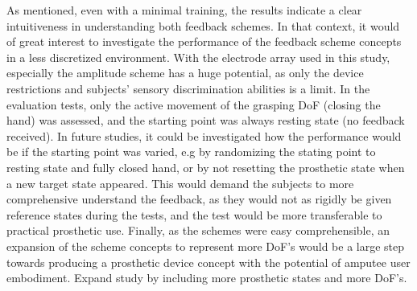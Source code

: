 As mentioned, even with a minimal training, the results indicate a clear intuitiveness in understanding both feedback schemes. In that context, it would of great interest to investigate the performance of the feedback scheme concepts in a less discretized environment. With the electrode array used in this study, especially the amplitude scheme has a huge potential, as only the device restrictions and subjects' sensory discrimination abilities is a limit.
In the evaluation tests, only the active movement of the grasping DoF (closing the hand) was assessed, and the starting point was always resting state (no feedback received). In future studies, it could be investigated how the performance would be if the starting point was varied, e.g by randomizing the stating point to resting state and fully closed hand, or by not resetting the prosthetic state when a new target state appeared. This would demand the subjects to more comprehensive understand the feedback, as they would not as rigidly be given reference states during the tests, and the test would be more transferable to practical prosthetic use.
Finally, as the schemes were easy comprehensible, an expansion of the scheme concepts to represent more DoF's would be a large step towards producing a prosthetic device concept with the potential of amputee user embodiment. 
Expand study by including more prosthetic states and more DoF’s.



